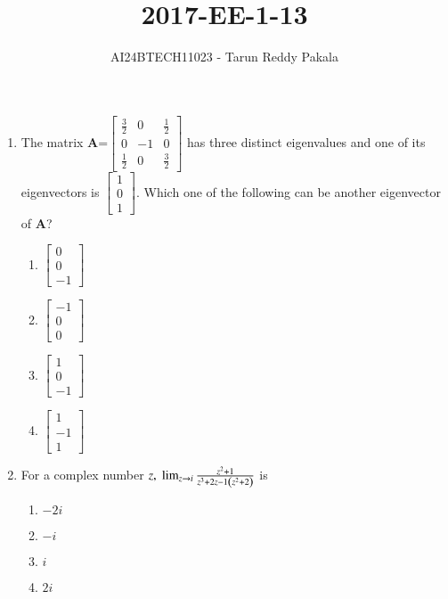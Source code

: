 \documentclass[journal,12pt,onecolumn]{IEEEtran}
\title{2017-EE-1-13}
\author{AI24BTECH11023 - Tarun Reddy Pakala}
\theoremstyle{remark}
\begin{document}


\maketitle
\bigskip
\renewcommand{\thefigure}{\theenumi}
\renewcommand{\thetable}{\theenumi}
\begin{enumerate}
\item The matrix \textbf{A}=$
\begin{bmatrix}
\frac{3}{2} & 0 & \frac{1}{2} \\
0 & -1 & 0 \\
\frac{1}{2} & 0 & \frac{3}{2}
\end{bmatrix}
$ has three distinct eigenvalues and one of its eigenvectors is $
\begin{bmatrix}
1  \\
0  \\
1 
\end{bmatrix}
$. Which one of the following can be another eigenvector of \textbf{A}?
\begin{enumerate}
    \item $
\begin{bmatrix}
0  \\
0  \\
-1 
\end{bmatrix}
$
    \item $
\begin{bmatrix}
-1  \\
0  \\
0
\end{bmatrix}
$
    \item $
\begin{bmatrix}
1 \\
0  \\
-1 
\end{bmatrix}
$
    \item $
\begin{bmatrix}
1  \\
-1  \\
1 
\end{bmatrix}
$
\end{enumerate}
\item For a complex number $z,\;\lim_{z\to i}\frac{z^2+1}{z^3+2z-1\left(z^2+2\right)}$ is
\begin{enumerate}
    \item $-2i$
    \item $-i$
    \item $i$
    \item $2i$

\end{enumerate}
\end{enumerate}
\end{document}
